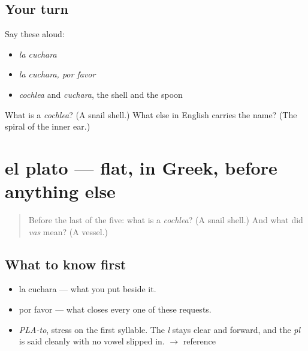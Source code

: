 \subsection*{Your turn}
Say these aloud:

\begin{itemize}
\raggedright
  \item \emph{la cuchara}
  \item \emph{la cuchara, por favor}
  \item \emph{cochlea} and \emph{cuchara}, the shell and the spoon
\end{itemize}

\begin{tcolorbox}[breakable,colback=teal!4,colframe=teal!35!black,title={Before you move on}]
What is a \emph{cochlea}? (A snail shell.) What else in English carries the name? (The spiral of the inner ear.)
\end{tcolorbox}
\section[el plato]{el plato — flat, in Greek, before anything else}

\label{lesson:ES-C287-plato}



\begin{quote}
Before the last of the five: what is a \emph{cochlea}? (A snail shell.) And what did \emph{vas} mean? (A vessel.)
\end{quote}

\subsection*{What to know first}
\begin{itemize}
\raggedright
  \item la cuchara — what you put beside it.
  \item por favor — what closes every one of these requests.
\end{itemize}

\begin{sounds}
\begin{itemize}
\raggedright
  \item \emph{PLA-to}, stress on the first syllable. The \emph{l} stays clear and forward, and the \emph{pl} is said cleanly with no vowel slipped in. $\to$ reference
\end{itemize}
\end{sounds}

